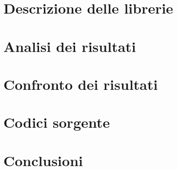 \documentclass[12pt,twoside]{report}
\begin{document}



\tableofcontents

\chapter{Descrizione delle librerie}


\chapter{Analisi dei risultati}


\chapter{Confronto dei risultati}


\chapter{Codici sorgente}



\chapter*{Conclusioni}

\end{document}
